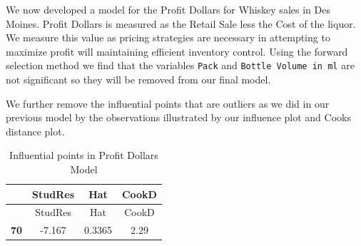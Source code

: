 \documentclass[]{elsarticle} %
\begin{document}
We now developed a model for the Profit Dollars for Whiskey sales in Des
Moines. Profit Dollars is measured as the Retail Sale less the Cost of
the liquor. We measure this value as pricing strategies are necessary in
attempting to maximize profit will maintaining efficient inventory
control. Using the forward selection method we find that the variables
\texttt{Pack} and \texttt{Bottle\ Volume\ in\ ml} are not significant so
they will be removed from our final model.

We further remove the influential points that are outliers as we did in
our previous model by the observations illustrated by our influence plot
and Cooks distance plot.

\begin{longtable}[]{@{}cccc@{}}
\caption{Influential points in Profit Dollars Model}\tabularnewline
\toprule
\begin{minipage}[b]{0.11\columnwidth}\centering\strut
~\strut
\end{minipage} & \begin{minipage}[b]{0.12\columnwidth}\centering\strut
StudRes\strut
\end{minipage} & \begin{minipage}[b]{0.09\columnwidth}\centering\strut
Hat\strut
\end{minipage} & \begin{minipage}[b]{0.09\columnwidth}\centering\strut
CookD\strut
\end{minipage}\tabularnewline
\midrule
\endfirsthead
\toprule
\begin{minipage}[b]{0.11\columnwidth}\centering\strut
~\strut
\end{minipage} & \begin{minipage}[b]{0.12\columnwidth}\centering\strut
StudRes\strut
\end{minipage} & \begin{minipage}[b]{0.09\columnwidth}\centering\strut
Hat\strut
\end{minipage} & \begin{minipage}[b]{0.09\columnwidth}\centering\strut
CookD\strut
\end{minipage}\tabularnewline
\midrule
\endhead
\begin{minipage}[t]{0.11\columnwidth}\centering\strut
\textbf{70}\strut
\end{minipage} & \begin{minipage}[t]{0.12\columnwidth}\centering\strut
-7.167\strut
\end{minipage} & \begin{minipage}[t]{0.09\columnwidth}\centering\strut
0.3365\strut
\end{minipage} & \begin{minipage}[t]{0.09\columnwidth}\centering\strut
2.29\strut
\end{minipage}\tabularnewline
\bottomrule
\end{longtable}
\end{document}
